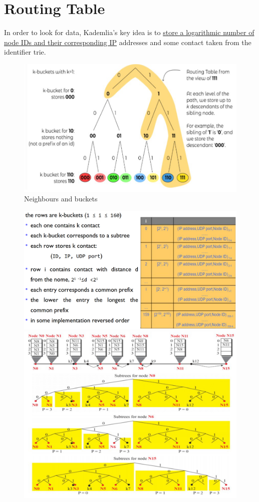 \section{Routing Table}
In order to look for data, Kademlia's key idea is to \ul{store a logarithmic number of node IDs and their corresponding IP} addresses and some contact taken from the identifier trie.

\begin{figure}[htbp]
   \centering
   \includegraphics{images/kademlia_routingtable.png}
   \caption{Neighbours and buckets}
   \label{fig:kademlia_routingtable.png}
\end{figure}

\begin{figure}[htbp]
   \centering
   \includegraphics[width=0.45\columnwidth]{images/kademlia_routing_table1.png}
   \includegraphics[width=0.45\columnwidth]{images/kademlia_routing_table2.png}
   \label{fig:kademlia_routing_table}
\end{figure}

